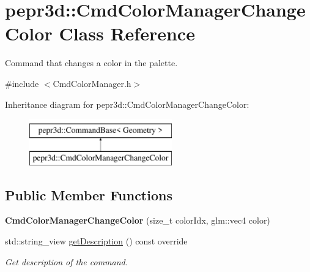 \hypertarget{classpepr3d_1_1_cmd_color_manager_change_color}{}\section{pepr3d\+::Cmd\+Color\+Manager\+Change\+Color Class Reference}
\label{classpepr3d_1_1_cmd_color_manager_change_color}


Command that changes a color in the palette.  




{\ttfamily \#include $<$Cmd\+Color\+Manager.\+h$>$}

Inheritance diagram for pepr3d\+::Cmd\+Color\+Manager\+Change\+Color\+:\begin{figure}[H]
\begin{center}
\leavevmode
\includegraphics[height=2.000000cm]{classpepr3d_1_1_cmd_color_manager_change_color}
\end{center}
\end{figure}
\subsection*{Public Member Functions}
\begin{DoxyCompactItemize}
\item 
\mbox{\label{classpepr3d_1_1_cmd_color_manager_change_color_a692f6a5497446867f9dd67a05badd53b}} 
{\bfseries Cmd\+Color\+Manager\+Change\+Color} (size\+\_\+t color\+Idx, glm\+::vec4 color)
\item 
\mbox{\label{classpepr3d_1_1_cmd_color_manager_change_color_a1d7bdcdb55b06f6829d320c8262e4ff6}} 
std\+::string\+\_\+view \mbox{\hyperlink{classpepr3d_1_1_cmd_color_manager_change_color_a1d7bdcdb55b06f6829d320c8262e4ff6}{get\+Description}} () const override
\begin{DoxyCompactList}\small\item\em Get description of the command. \end{DoxyCompactList}\end{DoxyCompactItemize}
